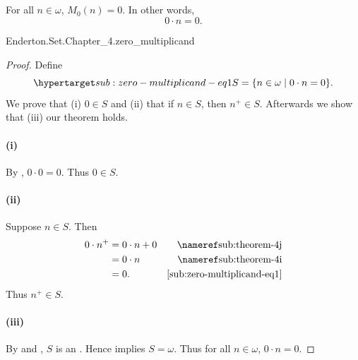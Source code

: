\documentclass{report}
\begin{document}
\subsection{}%

  \begin{lemma}
    For all $n \in \omega$, $M_0(n) = 0$.
    In other words, $$0 \cdot n = 0.$$
  \end{lemma}

    {Enderton.Set.Chapter\_4.zero\_multiplicand}


  \begin{proof}

    Define
      \begin{equation}
        \hyperlabel{sub:zero-multiplicand-eq1}
        S = \{n \in \omega \mid 0 \cdot n = 0\}.
      \end{equation}
    We prove that (i) $0 \in S$ and (ii) that if $n \in S$, then $n^+ \in S$.
    Afterwards we show that (iii) our theorem holds.

    \paragraph{(i)}%

      By , $0 \cdot 0 = 0$.
      Thus $0 \in S$.

    \paragraph{(ii)}%

      Suppose $n \in S$.
      Then
        \begin{align*}
          0 \cdot n^+
            & = 0 \cdot n + 0 & \textref{sub:theorem-4j} \\
            & = 0 \cdot n & \textref{sub:theorem-4i} \\
            & = 0. & \eqref{sub:zero-multiplicand-eq1}
        \end{align*}
      Thus $n^+ \in S$.

    \paragraph{(iii)}%

      By  and
        , $S$ is an
        .
      Hence  implies $S = \omega$.
      Thus for all $n \in \omega$, $0 \cdot n = 0$.

  \end{proof}
\end{document}
